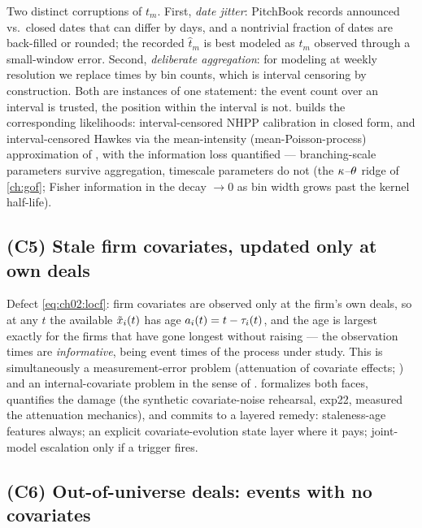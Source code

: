 Two distinct corruptions of $t_m$. First, \emph{date jitter}: PitchBook
records announced vs.\ closed dates that can differ by days, and a
nontrivial fraction of dates are back-filled or rounded; the recorded
$\hat t_m$ is best modeled as $t_m$ observed through a small-window error.
Second, \emph{deliberate aggregation}: for modeling at weekly resolution we
replace times by bin counts, which is interval censoring by construction.
Both are instances of one statement: the event count over an interval is
trusted, the position within the interval is not. 
builds the corresponding likelihoods: interval-censored NHPP calibration
in closed form, and interval-censored Hawkes via the mean-intensity
(mean-Poisson-process) approximation of \citet{rizoiu2022}, with the
information loss quantified --- branching-scale parameters survive
aggregation, timescale parameters do not (the $\kappa$--$\theta$ ridge of
\cref{ch:gof}; Fisher information in the decay $\to 0$ as bin width grows
past the kernel half-life).

\subsection*{(C5) Stale firm covariates, updated only at own deals}

Defect \cref{eq:ch02:locf}: firm covariates are observed only at the
firm's own deals, so at any $t$ the available $\tilde{x}_i(t)$ has age
$a_i(t) = t - \tau_i(t)$, and the age is largest exactly for the
firms that have gone longest without raising --- the observation times are
\emph{informative}, being event times of the process under study. This is
simultaneously a measurement-error problem (attenuation of covariate
effects; \citealp{carroll2006,prentice1982}) and an
internal-covariate problem in the sense of \citet{kalbfleisch2002}.
 formalizes both faces, quantifies the damage (the
synthetic covariate-noise rehearsal, exp22, measured the attenuation
mechanics), and commits to a layered remedy: staleness-age features
always; an explicit covariate-evolution state layer where it pays;
joint-model escalation \citep{rizopoulos2012,tsiatisdavidian2004} only if
a trigger fires.

\subsection*{(C6) Out-of-universe deals: events with no covariates}

